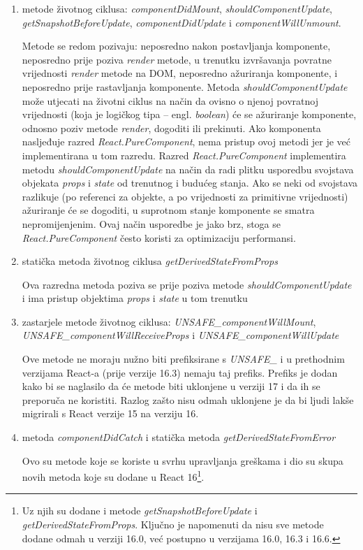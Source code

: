 \documentclass[times, utf8, diplomski, numeric]{fer}
\newcommand{\razmaks}{\vspace{10pt}}
\begin{document}
\begin{enumerate}[label=(\alph*)]
    \item metode životnog ciklusa: \emph{componentDidMount}, \emph{shouldComponentUpdate},
    \break \emph{getSnapshotBeforeUpdate}, \emph{componentDidUpdate} i \emph{componentWillUnmount}.
    
    Metode se redom pozivaju: neposredno nakon postavljanja komponente, neposredno prije poziva \emph{render} metode, u trenutku izvršavanja  povratne vrijednosti \emph{render} metode na DOM, neposredno ažuriranja komponente, i neposredno prije rastavljanja komponente.
    Metoda \emph{shouldComponentUpdate} može utjecati na životni ciklus na način da ovisno o njenoj povratnoj vrijednosti (koja je logičkog tipa – engl. \emph{boolean}) će se ažuriranje komponente, odnosno poziv metode \emph{render}, dogoditi ili prekinuti.
    Ako komponenta nasljeđuje razred \emph{React.PureComponent}, nema pristup ovoj metodi jer je već implementirana u tom razredu.
    Razred \emph{React.PureComponent} implementira metodu \emph{shouldComponentUpdate} na način da radi plitku usporedbu  svojstava objekata \emph{props} i \emph{state} od trenutnog i budućeg stanja. Ako se neki od svojstava razlikuje (po referenci za objekte, a po vrijednosti za primitivne vrijednosti) ažuriranje će se dogoditi, u suprotnom stanje komponente se smatra nepromijenjenim. Ovaj način usporedbe je jako brz, stoga se \emph{React.PureComponent} često koristi za optimizaciju performansi\citep{react_docs}.

    \item statička metoda životnog ciklusa \emph{getDerivedStateFromProps}
    
    Ova razredna metoda poziva se prije poziva metode \emph{shouldComponentUpdate} i ima pristup objektima \emph{props} i \emph{state} u tom trenutku

    \item zastarjele metode životnog ciklusa: \emph{UNSAFE\_componentWillMount},
    \break \emph{UNSAFE\_componentWillReceiveProps} i \emph{UNSAFE\_componentWillUpdate}

    Ove metode ne moraju nužno biti prefiksirane s \emph{UNSAFE\_} i u prethodnim verzijama React-a (prije verzije 16.3) nemaju taj prefiks.
    Prefiks je dodan kako bi se naglasilo da će metode biti uklonjene u verziji 17 i da ih se preporuča ne koristiti.
    Razlog zašto nisu odmah uklonjene je da bi ljudi lakše migrirali s React verzije 15 na verziju 16\citep{react_16_3}.

    \item metoda \emph{componentDidCatch} i statička metoda \emph{getDerivedStateFromError}
    
    Ovo su metode koje se koriste u svrhu upravljanja greškama  i dio su skupa novih metoda koje su dodane u React 16\footnote{
        Uz njih su dodane i metode \emph{getSnapshotBeforeUpdate} i \emph{getDerivedStateFromProps}. Ključno je napomenuti da nisu sve metode dodane odmah u verziji 16.0, već postupno u verzijama 16.0, 16.3 i 16.6\citep{gh_react_changelog}.
    }\citep{react_error}.
\end{enumerate}
\razmaks
\end{document}
